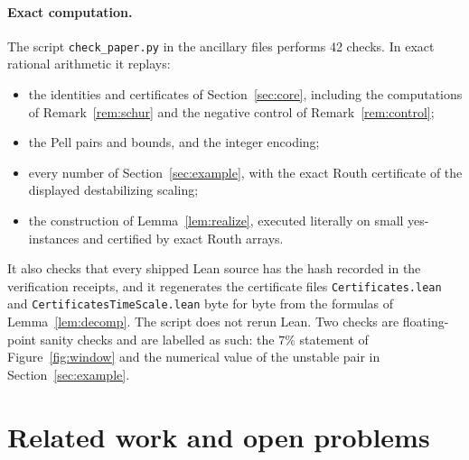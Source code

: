 \documentclass[11pt,a4paper]{article}
\theoremstyle{plain}
\theoremstyle{definition}
\theoremstyle{remark}
\begin{document}
\paragraph{Exact computation.}
The script \texttt{check\_paper.py} in the ancillary files performs 42 checks. In exact
rational arithmetic it replays:
\begin{itemize}
\item the identities and certificates of Section~\ref{sec:core}, including the computations
of Remark~\ref{rem:schur} and the negative control of Remark~\ref{rem:control};
\item the Pell pairs and bounds, and the integer encoding;
\item every number of Section~\ref{sec:example}, with the exact Routh certificate of the
displayed destabilizing scaling;
\item the construction of Lemma~\ref{lem:realize}, executed literally on small
yes-instances and certified by exact Routh arrays.
\end{itemize}
It also checks that every shipped Lean source has the hash recorded in the verification
receipts, and it regenerates the certificate files \texttt{Certificates.lean} and
\texttt{CertificatesTimeScale.lean} byte for byte from the formulas of
Lemma~\ref{lem:decomp}. The script does not rerun Lean. Two checks are
floating-point sanity checks and are labelled as such: the $7\%$ statement of
Figure~\ref{fig:window} and the numerical value of the unstable pair in
Section~\ref{sec:example}.

\section{Related work and open problems}\label{sec:discussion}\label{sec:related}
\end{document}
